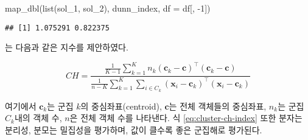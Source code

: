 \documentclass[
]{book}
\newenvironment{Shaded}{\begin{snugshade}}{\end{snugshade}}
\newcommand{\AttributeTok}[1]{\textcolor[rgb]{0.77,0.63,0.00}{#1}}
\newcommand{\CommentTok}[1]{\textcolor[rgb]{0.56,0.35,0.01}{\textit{#1}}}
\newcommand{\DecValTok}[1]{\textcolor[rgb]{0.00,0.00,0.81}{#1}}
\newcommand{\FunctionTok}[1]{\textcolor[rgb]{0.00,0.00,0.00}{#1}}
\newcommand{\NormalTok}[1]{#1}
\newcommand{\OtherTok}[1]{\textcolor[rgb]{0.56,0.35,0.01}{#1}}
\newcommand{\SpecialCharTok}[1]{\textcolor[rgb]{0.00,0.00,0.00}{#1}}
\begin{document}
\begin{Shaded}
\end{Shaded}

\begin{Shaded}
\begin{Highlighting}[]
\FunctionTok{map\_dbl}\NormalTok{(}\FunctionTok{list}\NormalTok{(sol\_1, sol\_2), dunn\_index, }\AttributeTok{df =}\NormalTok{ df[, }\SpecialCharTok{{-}}\DecValTok{1}\NormalTok{])}
\end{Highlighting}
\end{Shaded}

\begin{verbatim}
## [1] 1.075291 0.822375
\end{verbatim}

\citet{calinski1974dendrite} 는 다음과 같은 지수를 제안하였다.

\begin{equation}
CH = \frac{\frac{1}{K - 1} \sum_{k = 1}^{K} n_k (\mathbf{c}_k - \mathbf{c})^\top (\mathbf{c}_k - \mathbf{c})}{\frac{1}{n - K} \sum_{k = 1}^{K} \sum_{i \in C_k} (\mathbf{x}_i - \mathbf{c}_k)^\top (\mathbf{x}_i - \mathbf{c}_k)} \label{eq:cluster-ch-index}
\end{equation}

여기에서 \(\mathbf{c}_k\)는 군집 \(k\)의 중심좌표(centroid), \(\mathbf{c}\)는 전체 객체들의 중심좌표, \(n_k\)는 군집 \(C_k\)내의 객체 수, \(n\)은 전체 객체 수를 나타낸다. 식 \eqref{eq:cluster-ch-index} 또한 분자는 분리성, 분모는 밀집성을 평가하며, 값이 클수록 좋은 군집해로 평가된다.
\end{document}
